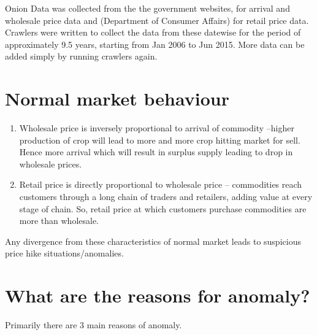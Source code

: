Onion Data was collected from the the government websites,\cite{agmarknet} for arrival and wholesale price data and \cite{retailpricecollection} (Department of Consumer Affairs) for retail price data. Crawlers were written to collect the data from these datewise for the period of approximately 9.5 years, starting from Jan 2006 to Jun 2015. More data can be added simply by running crawlers again.


\section{Normal market behaviour}

\begin{enumerate}

\item Wholesale price is inversely proportional to arrival of commodity –higher production of crop will lead to more and more crop hitting market for sell. Hence more arrival which will result in surplus supply leading to drop in wholesale prices.

\item  Retail price is directly proportional to wholesale price – commodities reach customers through a long chain of traders and retailers, adding value at every stage of chain. So, retail price at which customers purchase commodities are more than wholesale.

\end{enumerate}

Any divergence from these characteristics of normal market leads to suspicious price hike situations/anomalies.


\section{What are the reasons for anomaly?}

Primarily there are 3 main reasons of anomaly.

